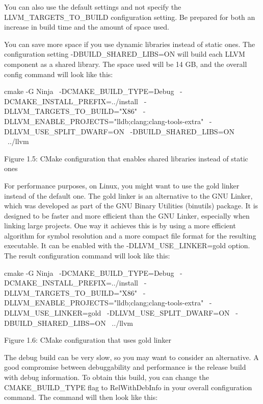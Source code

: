 You can also use the default settings and not specify the LLVM\_TARGETS\_TO\_BUILD configuration setting. Be prepared for both an increase in build time and the amount of space used.

You can save more space if you use dynamic libraries instead of static ones. The configuration setting -DBUILD\_SHARED\_LIBS=ON will build each LLVM component as a shared library. The space used will be 14 GB, and the overall config command will look like this:


\begin{shell}
cmake -G Ninja \
  -DCMAKE_BUILD_TYPE=Debug \
  -DCMAKE_INSTALL_PREFIX=../install \
  -DLLVM_TARGETS_TO_BUILD="X86" \
  -DLLVM_ENABLE_PROJECTS="lldb;clang;clang-tools-extra" \
  -DLLVM_USE_SPLIT_DWARF=ON \
  -DBUILD_SHARED_LIBS=ON \
  ../llvm
\end{shell}

\begin{center}
Figure 1.5: CMake configuration that enables shared libraries instead of static ones
\end{center}

For performance purposes, on Linux, you might want to use the gold linker instead of the default one. The gold linker is an alternative to the GNU Linker, which was developed as part of the GNU Binary Utilities (binutils) package. It is designed to be faster and more efficient than the GNU Linker, especially when linking large projects. One way it achieves this is by using a more efficient algorithm for symbol resolution and a more compact file format for the resulting executable. It can be enabled with the -DLLVM\_USE\_LINKER=gold option. The result configuration command will look like this:

\begin{shell}
cmake -G Ninja \
  -DCMAKE_BUILD_TYPE=Debug \
  -DCMAKE_INSTALL_PREFIX=../install \
  -DLLVM_TARGETS_TO_BUILD="X86" \
  -DLLVM_ENABLE_PROJECTS="lldb;clang;clang-tools-extra" \
  -DLLVM_USE_LINKER=gold \
  -DLLVM_USE_SPLIT_DWARF=ON \
  -DBUILD_SHARED_LIBS=ON \
  ../llvm
\end{shell}

\begin{center}
Figure 1.6: CMake configuration that uses gold linker
\end{center}

The debug build can be very slow, so you may want to consider an alternative. A good compromise between debuggability and performance is the release build with debug information. To obtain this build, you can change the CMAKE\_BUILD\_TYPE flag to RelWithDebInfo in your overall configuration command. The command will then look like this:


